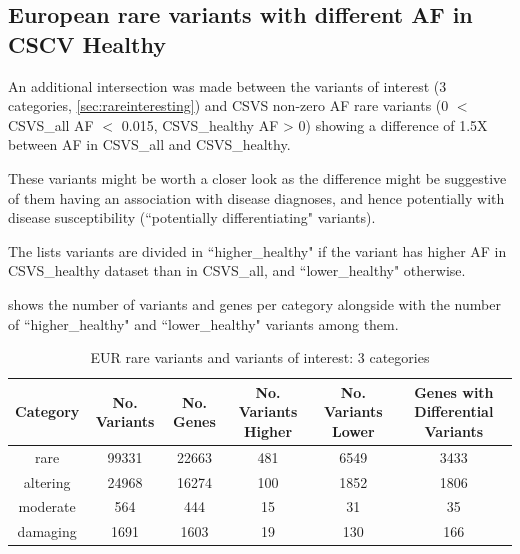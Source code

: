 \documentclass{article}\usepackage[]{graphicx}\usepackage[dvipsnames]{xcolor}
\begin{document}
\subsection{European rare variants with different AF in CSCV Healthy}
\label{sec:diff}

An additional intersection was made between the variants of interest (3 categories, \autoref{sec:rareinteresting}) and CSVS non-zero AF rare variants (0 $<$ CSVS\_all AF $<$ 0.015, CSVS\_healthy AF > 0) showing a difference of 1.5X between AF in CSVS\_all and CSVS\_healthy.

These variants might be worth a closer look as the difference might be suggestive of them having an association with disease diagnoses, and hence potentially with disease susceptibility (``potentially differentiating" variants).

The lists variants are divided in ``higher\_healthy" if the variant has higher AF in CSVS\_healthy dataset than in CSVS\_all, and ``lower\_healthy" otherwise.

\label{table:csvs} shows the number of variants and genes per category alongside with the number of ``higher\_healthy"  and  ``lower\_healthy"  variants among them.


\begin{table}[h!]
\centering
 \caption{EUR rare variants and variants of interest: 3 categories}
 \begin{tabular}{|c c c c c c|} 
 \hline
Category  &  No. Variants &  No. Genes  & No. Variants Higher  & \textcolor{graphite}{No. Variants Lower} &  Genes with Differential Variants\\ [0.5ex] 
 \hline\hline
rare & 99331 & 22663  & \textcolor{graphite}{481} & 6549 & 3433\\
altering & 24968 & 16274  & \textcolor{graphite}{100} & 1852 & 1806\\
moderate & 564 & 444 & \textcolor{graphite}{15} & 31 & 35 \\
damaging & 1691 & 1603 & \textcolor{graphite}{19} & 130 & 166 \\[1ex] 
 \hline
 \end{tabular}
\label{table:csvs}
\end{table}
\end{document}
